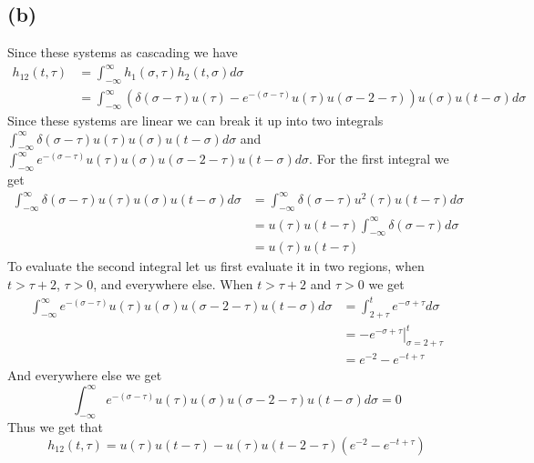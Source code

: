 \documentclass[12pt]{article}
\begin{document}
\subsection*{(b)}
Since these systems as cascading we have
\begin{align*}
h_{12}(t,\tau)&=\int_{-\infty}^{\infty}h_1(\sigma,\tau)h_2(t,\sigma)d\sigma\\
&=\int_{-\infty}^{\infty}\left(\delta(\sigma-\tau)u(\tau)-e^{-(\sigma-\tau)}u(\tau)u(\sigma-2-\tau)\right)u(\sigma)u(t-\sigma)d\sigma
\end{align*}
Since these systems are linear we can break it up into two integrals $\int_{-\infty}^{\infty}\delta(\sigma-\tau)u(\tau)u(\sigma)u(t-\sigma)d\sigma$ and $\int_{-\infty}^{\infty}e^{-(\sigma-\tau)}u(\tau)u(\sigma)u(\sigma-2-\tau)u(t-\sigma)d\sigma$. For the first integral we get
\begin{align*}
\int_{-\infty}^{\infty}\delta(\sigma-\tau)u(\tau)u(\sigma)u(t-\sigma)d\sigma&=\int_{-\infty}^{\infty}\delta(\sigma-\tau)u^2(\tau)u(t-\tau)d\sigma\\
&=u(\tau)u(t-\tau)\int_{-\infty}^{\infty}\delta(\sigma-\tau)d\sigma\\
&=u(\tau)u(t-\tau)
\end{align*}
To evaluate the second integral let us first evaluate it in two regions, when $t>\tau+2$, $\tau>0$, and everywhere else. When $t>\tau+2$ and $\tau>0$ we get
\begin{align*}
\int_{-\infty}^{\infty}e^{-(\sigma-\tau)}u(\tau)u(\sigma)u(\sigma-2-\tau)u(t-\sigma)d\sigma&=\int_{2+\tau}^{t}e^{-\sigma+\tau}d\sigma\\
&=\left.-e^{-\sigma+\tau}\right|_{\sigma=2+\tau}^{t}\\
&=e^{-2}-e^{-t+\tau}
\end{align*}
And everywhere else we get 
$$\int_{-\infty}^{\infty}e^{-(\sigma-\tau)}u(\tau)u(\sigma)u(\sigma-2-\tau)u(t-\sigma)d\sigma=0$$
Thus we get that 
$$h_{12}(t,\tau)=\boxed{u(\tau)u(t-\tau)-u(\tau)u(t-2-\tau)(e^{-2}-e^{-t+\tau})}$$
\end{document}
